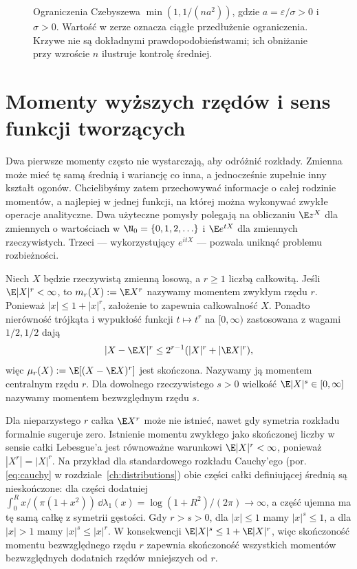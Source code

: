 \begin{figure}[htbp]
\caption{Ograniczenia Czebyszewa $\min(1,1/(na^2))$,
gdzie $a=\varepsilon/\sigma>0$ i $\sigma>0$.
Wartość w zerze oznacza ciągłe przedłużenie ograniczenia.
Krzywe nie są dokładnymi prawdopodobieństwami;
ich obniżanie przy wzroście $n$ ilustruje kontrolę średniej.}
\label{fig:rp1-05-chebyshev-average}
\end{figure}


\section{Momenty wyższych rzędów i sens funkcji tworzących}

Dwa pierwsze momenty często nie wystarczają, aby odróżnić
rozkłady. Zmienna może mieć tę samą średnią i wariancję co inna,
a jednocześnie zupełnie inny kształt ogonów. Chcielibyśmy zatem
przechowywać informacje o całej rodzinie momentów, a najlepiej
w jednej funkcji, na której można wykonywać zwykłe operacje
analityczne. Dwa użyteczne pomysły polegają na obliczaniu
$\E z^X$ dla zmiennych o wartościach w $\N_0=\{0,1,2,\ldots\}$ i $\E e^{tX}$
dla zmiennych rzeczywistych. Trzeci --- wykorzystujący
$e^{itX}$ --- pozwala uniknąć problemu rozbieżności.

\begin{definicja}
Niech $X$ będzie rzeczywistą zmienną losową, a $r\geq1$
liczbą całkowitą. Jeśli $\E|X|^r<\infty$, to
$m_r(X):=\E X^r$ nazywamy momentem zwykłym rzędu $r$.
Ponieważ $|x|\leq1+|x|^r$, założenie to zapewnia
całkowalność $X$. Ponadto nierówność trójkąta i wypukłość funkcji
$t\mapsto t^r$ na $[0,\infty)$ zastosowana z wagami
$1/2,1/2$ dają
\[
|X-\E X|^r\leq 2^{r-1}(|X|^r+|\E X|^r),
\]
więc $\mu_r(X):=\E[(X-\E X)^r]$ jest skończona.
Nazywamy ją momentem centralnym rzędu $r$.
Dla dowolnego rzeczywistego $s>0$ wielkość
$\E|X|^s\in[0,\infty]$ nazywamy momentem bezwzględnym
rzędu $s$.
\end{definicja}

\begin{uwaga}
Dla nieparzystego $r$ całka $\E X^r$ może nie istnieć,
nawet gdy symetria rozkładu formalnie sugeruje zero.
Istnienie momentu zwykłego jako skończonej liczby
w sensie całki Lebesgue'a jest równoważne warunkowi
$\E|X|^r<\infty$, ponieważ $|X^r|=|X|^r$.
Na przykład dla standardowego rozkładu Cauchy'ego
(por. \eqref{eq:cauchy} w rozdziale~\ref{ch:distributions})
obie części całki definiującej średnią są nieskończone:
dla części dodatniej
$\int_0^R x/(\pi(1+x^2))\,\dd\lambda_1(x)
=\log(1+R^2)/(2\pi)\to\infty$, a część ujemna
ma tę samą całkę z symetrii gęstości.
Gdy $r>s>0$, dla $|x|\leq1$ mamy $|x|^s\leq1$,
a dla $|x|>1$ mamy $|x|^s\leq|x|^r$.
W konsekwencji $\E|X|^s\leq1+\E|X|^r$,
więc skończoność momentu bezwzględnego rzędu $r$
zapewnia skończoność wszystkich momentów bezwzględnych
dodatnich rzędów mniejszych od $r$.
\end{uwaga}

